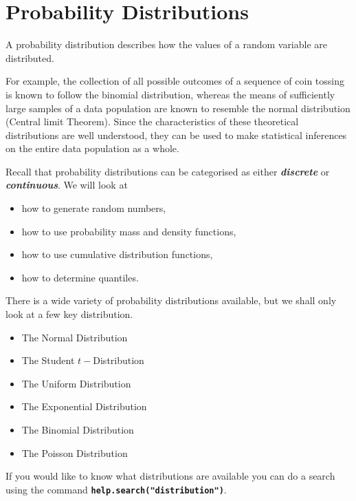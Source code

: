 



\section{Probability Distributions}
A probability distribution describes how the values of a random variable are distributed. 

For example, the collection of all possible outcomes of a sequence of coin tossing is known to follow the binomial distribution, whereas the means of sufficiently large samples of a data population are known to resemble the normal distribution (Central limit Theorem). Since the characteristics of these theoretical distributions are well understood, they can be used to make statistical inferences on the entire data population as a whole.

Recall that probability distributions can be categorised as either \textit{\textbf{discrete}} or \textit{\textbf{continuous}}.
We will look at  
\begin{itemize}
\item how to generate random numbers,
\item how to use probability mass and density functions,
\item how to use cumulative distribution functions,
\item how to determine quantiles.
\end{itemize} 

There is a wide variety of probability distributions available, but we shall only look at a few key distribution. 

\begin{itemize}
\item	The Normal Distribution
\item	The Student $t-$Distribution
\item   The Uniform Distribution
\item	The Exponential Distribution
\item	The Binomial Distribution
\item	The Poisson Distribution
\end{itemize}

If you would like to know what distributions are available you can do a search using the command \texttt{\textbf{help.search("distribution")}}. 



